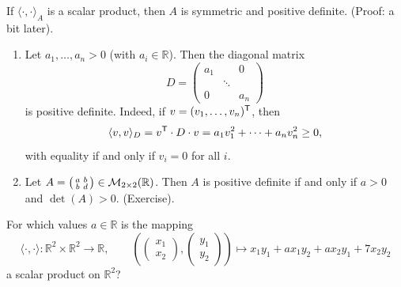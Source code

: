 \begin{claim*}
\label{claim:scalar_product_forces_pos_def}
    If $\langle \cdot, \cdot \rangle_A$ is a scalar product, then $A$ is symmetric and positive definite. (Proof: a bit later).
\end{claim*}

\begin{example}
\label{ex:pos_def_examples_real}
\begin{enumerate}[label=\textbf{(\alph*)}]
    \item Let $a_1, \dots, a_n > 0$ (with $a_i \in \mathbb{R}$). Then the diagonal matrix
    \[
        D = \begin{pmatrix} a_1 & & 0 \\ & \ddots & \\ 0 & & a_n \end{pmatrix}
    \]
    is positive definite. Indeed, if $v = (v_1, \dots, v_n)^{\mathsf{T}}$, then
    \[
        \langle v, v \rangle_D = v^{\mathsf{T}} \cdot D \cdot v = a_1 v_1^2 + \dots + a_n v_n^2 \geq 0,
    \]
    with equality if and only if $v_i = 0$ for all $i$.
    \item Let $A = \left(\begin{smallmatrix} a & b \\ b & d \end{smallmatrix}\right) \in \mathcal{M}_{2 \times 2}(\mathbb{R})$. Then $A$ is positive definite if and only if $a > 0$ and $\det(A) > 0$. (Exercise).
\end{enumerate}
\end{example}

\begin{exercise}
  \label{exc:inner_product_parameter_a}
  For which values $a \in \mathbb{R}$ is the mapping
  \[
  \langle \cdot, \cdot \rangle : \mathbb{R}^2 \times \mathbb{R}^2 \longrightarrow \mathbb{R}, \qquad \left( \begin{pmatrix} x_1 \\ x_2 \end{pmatrix}, \begin{pmatrix} y_1 \\ y_2 \end{pmatrix} \right) \longmapsto x_1 y_1 + a x_1 y_2 + a x_2 y_1 + 7 x_2 y_2
  \]
  a scalar product on $\mathbb{R}^2$?
\end{exercise}


